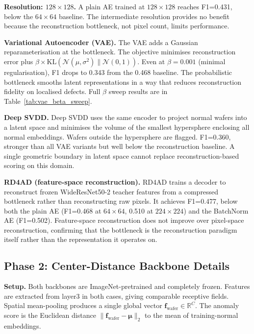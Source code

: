 \documentclass[11pt]{article}
\begin{document}
\textbf{Resolution: $128\!\times\!128$.} A plain AE trained at $128\!\times\!128$ reaches F1=0.431, below the $64\!\times\!64$ baseline. The intermediate resolution provides no benefit because the reconstruction bottleneck, not pixel count, limits performance.

\textbf{Variational Autoencoder (VAE).} The VAE adds a Gaussian reparameterisation at the bottleneck. The objective minimises reconstruction error plus $\beta \times \mathrm{KL}(\mathcal{N}(\mu, \sigma^2) \| \mathcal{N}(0,1))$. Even at $\beta=0.001$ (minimal regularisation), F1 drops to 0.343 from the 0.468 baseline. The probabilistic bottleneck smooths latent representations in a way that reduces reconstruction fidelity on localised defects. Full $\beta$ sweep results are in Table~\ref{tab:vae_beta_sweep}.

\textbf{Deep SVDD.} Deep SVDD uses the same encoder to project normal wafers into a latent space and minimises the volume of the smallest hypersphere enclosing all normal embeddings. Wafers outside the hypersphere are flagged. F1=0.360, stronger than all VAE variants but well below the reconstruction baseline. A single geometric boundary in latent space cannot replace reconstruction-based scoring on this domain.

\textbf{RD4AD (feature-space reconstruction).} RD4AD trains a decoder to reconstruct frozen WideResNet50-2 teacher features from a compressed bottleneck rather than reconstructing raw pixels. It achieves F1=0.477, below both the plain AE (F1=0.468 at $64\!\times\!64$, 0.510 at $224\!\times\!224$) and the BatchNorm AE (F1=0.502). Feature-space reconstruction does not improve over pixel-space reconstruction, confirming that the bottleneck is the reconstruction paradigm itself rather than the representation it operates on.

\subsection{Phase 2: Center-Distance Backbone Details}
\label{app:centerdist_details}

\textbf{Setup.} Both backbones are ImageNet-pretrained and completely frozen. Features are extracted from layer3 in both cases, giving comparable receptive fields. Spatial mean-pooling produces a single global vector $\mathbf{f}_{\text{wafer}} \in \mathbb{R}^C$. The anomaly score is the Euclidean distance $\|\mathbf{f}_{\text{wafer}} - \boldsymbol{\mu}\|_2$ to the mean of training-normal embeddings.
\end{document}
